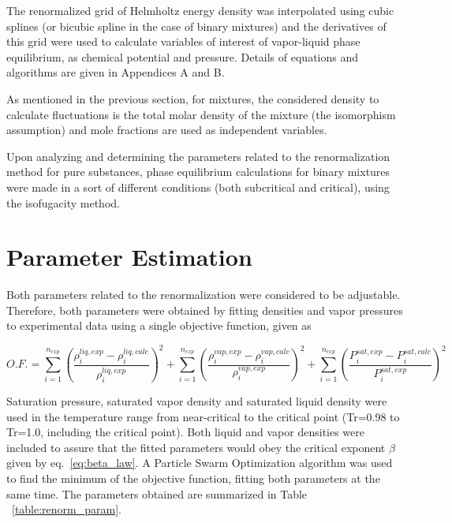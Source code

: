 \documentclass[preprint,12pt,3p]{elsarticle}
\begin{document}
    The renormalized grid of Helmholtz energy density was interpolated using cubic splines (or bicubic spline in the case of binary mixtures) and the derivatives of this grid were used to calculate variables of interest of vapor-liquid phase equilibrium, as chemical potential and pressure. Details of equations and algorithms are given in Appendices A and B.

    As mentioned in the previous section, for mixtures, the considered density to calculate fluctuations is the total molar density of the mixture (the isomorphism assumption) and mole fractions are used as independent variables.

    Upon analyzing and determining the parameters related to the renormalization method for pure substances, phase equilibrium calculations for binary mixtures were made in a sort of different conditions (both subcritical and critical), using the isofugacity method.
    
\section{Parameter Estimation}
    Both parameters related to the renormalization were considered to be adjustable. Therefore, both parameters were obtained by fitting densities and vapor pressures to experimental data using a single objective function, given as

\begin{equation}   \label{eq:OF}
O.F.=\sum_{i=1}^{n_{exp}} \left(\frac{\rho_{i}^{liq,exp}-\rho_{i}^{liq,calc}}{\rho_{i}^{liq,exp}}\right)^2 + \sum_{i=1}^{n_{exp}} \left(\frac{\rho_{i}^{vap,exp}-\rho_{i}^{vap,calc}}{\rho_{i}^{vap,exp}}\right)^2 + \sum_{i=1}^{n_{exp}} \left(\frac{P_{i}^{sat,exp}-P_{i}^{sat,calc}}{P_{i}^{sat,exp}}\right)^2
\end{equation}

    Saturation pressure, saturated vapor density and saturated liquid density were used in the temperature range from near-critical to the critical point (Tr=0.98 to Tr=1.0, including the critical point). Both liquid and vapor densities were included to assure that the fitted parameters would obey the critical exponent $\beta$ given by eq.~\ref{eq:beta_law}. A Particle Swarm Optimization algorithm was used to find the minimum of the objective function, fitting both parameters at the same time. The parameters obtained are summarized in Table ~\ref{table:renorm_param}.
    
\end{document}
